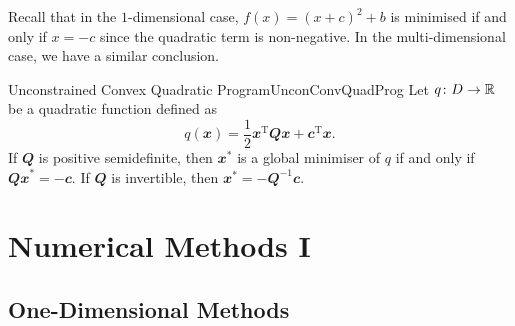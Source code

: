 \documentclass[math, code]{amznotes}
\theoremstyle{remark}
\begin{document}
Recall that in the $1$-dimensional case, $f(x) = (x + c)^2 + b$ is minimised if and only if $x = -c$ since the quadratic term is non-negative. In the multi-dimensional case, we have a similar conclusion.
\begin{thmbox}{Unconstrained Convex Quadratic Program}{UnconConvQuadProg}
    Let $q \colon D \to \mathbb{R}$ be a quadratic function defined as
    \begin{equation*}
        q(\mathbfit{x}) = \frac{1}{2}\mathbfit{x}^{\mathrm{T}}\mathbfit{Qx} + \mathbfit{c}^{\mathrm{T}}\mathbfit{x}.
    \end{equation*}
    If $\mathbfit{Q}$ is positive semidefinite, then $\mathbfit{x}^*$ is a global minimiser of $q$ if and only if $\mathbfit{Qx}^* = -\mathbfit{c}$. If $\mathbfit{Q}$ is invertible, then $\mathbfit{x}^* = -\mathbfit{Q}^{-1}\mathbfit{c}$. 
\end{thmbox}

\chapter{Numerical Methods I}
\section{One-Dimensional Methods}
\end{document}
